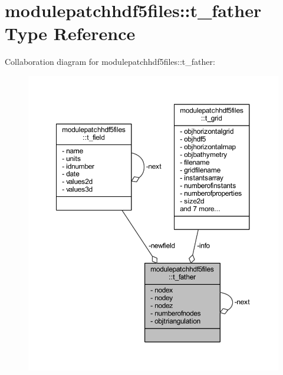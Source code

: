 \hypertarget{structmodulepatchhdf5files_1_1t__father}{}\section{modulepatchhdf5files\+:\+:t\+\_\+father Type Reference}
\label{structmodulepatchhdf5files_1_1t__father}


Collaboration diagram for modulepatchhdf5files\+:\+:t\+\_\+father\+:\nopagebreak
\begin{figure}[H]
\begin{center}
\leavevmode
\includegraphics[width=350pt]{structmodulepatchhdf5files_1_1t__father__coll__graph}
\end{center}
\end{figure}
